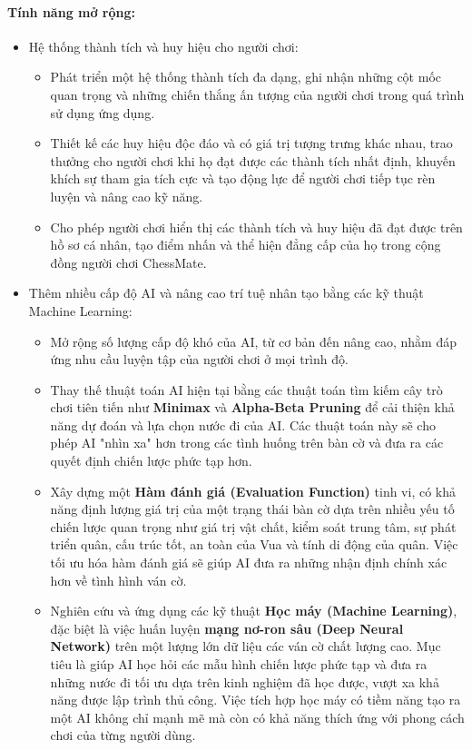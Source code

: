 \documentclass[a4paper,12pt]{article}
\begin{document}
\paragraph{\textbf{Tính năng mở rộng:}} %
\begin{itemize}[label=$\cdot$]
    \item Hệ thống thành tích và huy hiệu cho người chơi:
    \begin{itemize}[label=$\circ$]
        \item Phát triển một hệ thống thành tích đa dạng, ghi nhận những cột mốc quan trọng và những chiến thắng ấn tượng của người chơi trong quá trình sử dụng ứng dụng.
        \item Thiết kế các huy hiệu độc đáo và có giá trị tượng trưng khác nhau, trao thưởng cho người chơi khi họ đạt được các thành tích nhất định, khuyến khích sự tham gia tích cực và tạo động lực để người chơi tiếp tục rèn luyện và nâng cao kỹ năng.
        \item Cho phép người chơi hiển thị các thành tích và huy hiệu đã đạt được trên hồ sơ cá nhân, tạo điểm nhấn và thể hiện đẳng cấp của họ trong cộng đồng người chơi ChessMate.
    \end{itemize}
    \item Thêm nhiều cấp độ AI và nâng cao trí tuệ nhân tạo bằng các kỹ thuật Machine Learning:
    \begin{itemize}[label=$\circ$]
        \item Mở rộng số lượng cấp độ khó của AI, từ cơ bản đến nâng cao, nhằm đáp ứng nhu cầu luyện tập của người chơi ở mọi trình độ.
        \item Thay thế thuật toán AI hiện tại bằng các thuật toán tìm kiếm cây trò chơi tiên tiến như \textbf{Minimax} và \textbf{Alpha-Beta Pruning} để cải thiện khả năng dự đoán và lựa chọn nước đi của AI. Các thuật toán này sẽ cho phép AI "nhìn xa" hơn trong các tình huống trên bàn cờ và đưa ra các quyết định chiến lược phức tạp hơn.
        \item Xây dựng một \textbf{Hàm đánh giá (Evaluation Function)} tinh vi, có khả năng định lượng giá trị của một trạng thái bàn cờ dựa trên nhiều yếu tố chiến lược quan trọng như giá trị vật chất, kiểm soát trung tâm, sự phát triển quân, cấu trúc tốt, an toàn của Vua và tính di động của quân. Việc tối ưu hóa hàm đánh giá sẽ giúp AI đưa ra những nhận định chính xác hơn về tình hình ván cờ.
        \item Nghiên cứu và ứng dụng các kỹ thuật \textbf{Học máy (Machine Learning)}, đặc biệt là việc huấn luyện \textbf{mạng nơ-ron sâu (Deep Neural Network)} trên một lượng lớn dữ liệu các ván cờ chất lượng cao. Mục tiêu là giúp AI học hỏi các mẫu hình chiến lược phức tạp và đưa ra những nước đi tối ưu dựa trên kinh nghiệm đã học được, vượt xa khả năng được lập trình thủ công. Việc tích hợp học máy có tiềm năng tạo ra một AI không chỉ mạnh mẽ mà còn có khả năng thích ứng với phong cách chơi của từng người dùng.
    \end{itemize}
\end{itemize}
\end{document}
